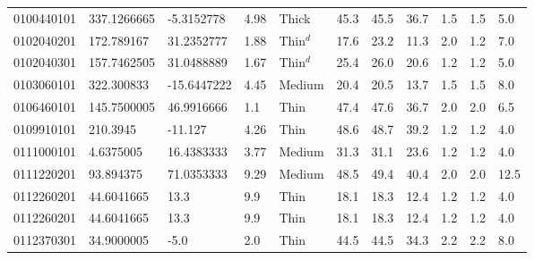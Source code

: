 \documentclass[fleqn,usenatbib]{mnras}
\begin{document}
\begin{table*}
\begin{tabular}{lllllllllll}
                        0100440101 &  337.1266665 &   -5.3152778 &                  4.98 &     Thick &      45.3 &       45.5 &        36.7 &              1.5 &              1.5 &              5.0 \\
                        0102040201 &   172.789167 &   31.2352777 &                  1.88 &  Thin$^d$ &      17.6 &       23.2 &        11.3 &              2.0 &              1.2 &              7.0 \\
                        0102040301 &  157.7462505 &   31.0488889 &                  1.67 &  Thin$^d$ &      25.4 &       26.0 &        20.6 &              1.2 &              1.2 &              5.0 \\
                        0103060101 &   322.300833 &  -15.6447222 &                  4.45 &    Medium &      20.4 &       20.5 &        13.7 &              1.5 &              1.5 &              8.0 \\
                        0106460101 &  145.7500005 &   46.9916666 &                   1.1 &      Thin &      47.4 &       47.6 &        36.7 &              2.0 &              2.0 &              6.5 \\
                        0109910101 &     210.3945 &      -11.127 &                  4.26 &      Thin &      48.6 &       48.7 &        39.2 &              1.2 &              1.2 &              4.0 \\
                        0111000101 &    4.6375005 &   16.4383333 &                  3.77 &    Medium &      31.3 &       31.1 &        23.6 &              1.2 &              1.2 &              4.0 \\
                        0111220201 &    93.894375 &   71.0353333 &                  9.29 &    Medium &      48.5 &       49.4 &        40.4 &              2.0 &              2.0 &             12.5 \\
                        0112260201 &   44.6041665 &         13.3 &                   9.9 &      Thin &      18.1 &       18.3 &        12.4 &              1.2 &              1.2 &              4.0 \\
                        0112260201 &   44.6041665 &         13.3 &                   9.9 &      Thin &      18.1 &       18.3 &        12.4 &              1.2 &              1.2 &              4.0 \\
                        0112370301 &   34.9000005 &         -5.0 &                   2.0 &      Thin &      44.5 &       44.5 &        34.3 &              2.2 &              2.2 &              8.0 \\

\end{tabular}
\end{table*}
\end{document}
